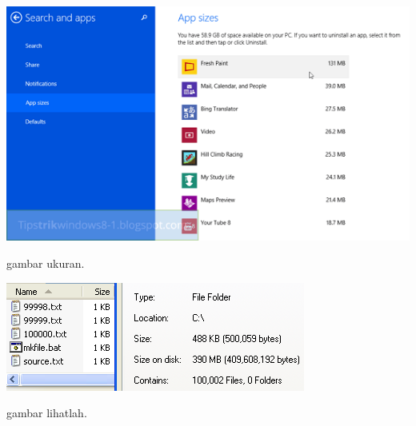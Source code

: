 \begin{figures}[ht]
\centerline{\includegraphics[width=1\texwidth]{figures/ukuran.PNG}}
\caption{gambar ukuran.}
\label{ukuran.png}
\end{figures}

\begin{figures}[ht]
\centerline{\includegraphics[width=1\texwidth]{figures/lihatlah.png}}
\caption{gambar lihatlah.}
\label{lihatlah.png}
\end{figures}